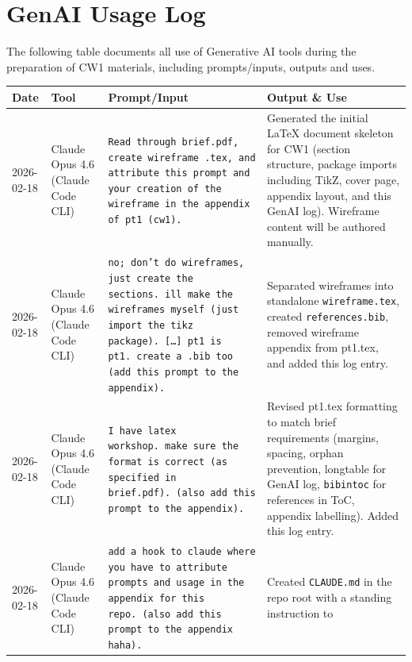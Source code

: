 \documentclass[a4paper,11pt]{article}
\begin{document}
\newpage
\appendix

\section{GenAI Usage Log}\label{app:genai}

The following table documents all use of Generative AI tools during the
preparation of CW1 materials, including prompts/inputs, outputs and uses.

\vspace{0.5em}
\noindent
\begin{longtable}{@{}p{1.8cm}p{2.8cm}p{4.5cm}p{4.5cm}@{}}
\toprule
\textbf{Date} & \textbf{Tool} & \textbf{Prompt/Input} & \textbf{Output \& Use} \\
\midrule
\endhead
2026-02-18
& Claude Opus 4.6 (Claude Code CLI)
& \texttt{Read through brief.pdf, create wireframe .tex, and attribute this
  prompt and your creation of the wireframe in the appendix of pt1 (cw1).}
& Generated the initial \LaTeX{} document skeleton for CW1 (section structure,
  package imports including TikZ, cover page, appendix layout, and this GenAI
  log).  Wireframe content will be authored manually. \\
\midrule
2026-02-18
& Claude Opus 4.6 (Claude Code CLI)
& \texttt{no; don't do wireframes, just create the sections.\ ill make the
  wireframes myself (just import the tikz package).\ [\ldots] pt1 is pt1.\
  create a .bib too (add this prompt to the appendix).}
& Separated wireframes into standalone \texttt{wireframe.tex}, created
  \texttt{references.bib}, removed wireframe appendix from pt1.tex, and added
  this log entry. \\
\midrule
2026-02-18
& Claude Opus 4.6 (Claude Code CLI)
& \texttt{I have latex workshop.\ make sure the format is correct (as specified
  in brief.pdf).\ (also add this prompt to the appendix).}
& Revised pt1.tex formatting to match brief requirements (margins, spacing,
  orphan prevention, longtable for GenAI log, \texttt{bibintoc} for references
  in ToC, appendix labelling).  Added this log entry. \\
\midrule
2026-02-18
& Claude Opus 4.6 (Claude Code CLI)
& \texttt{add a hook to claude where you have to attribute prompts and usage in
  the appendix for this repo.\ (also add this prompt to the appendix haha).}
& Created \texttt{CLAUDE.md} in the repo root with a standing instruction to

\end{longtable}
\end{document}
